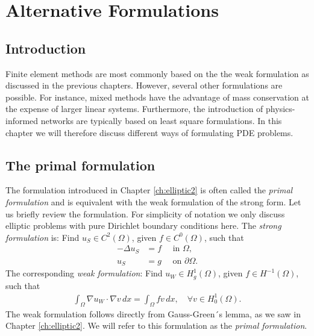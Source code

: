 \chapter{Alternative Formulations}


\section{Introduction}

Finite element methods are most commonly based on the the weak formulation as discussed in 
the previous chapters. However, several other formulations are possible.  
For instance, mixed methods have the advantage of mass conservation at the expense of larger linear systems.  
Furthermore, the introduction  of physics-informed networks are typically based on least square formulations.  
In this chapter we will therefore discuss different ways of formulating PDE problems. 

\section{The primal formulation}
The formulation introduced in Chapter \ref{ch:elliptic2} is often called the \emph{primal formulation}
and is equivalent with the weak formulation of the strong form.  
Let us briefly review the formulation. For simplicity of notation we only discuss elliptic problems 
with pure Dirichlet boundary conditions here.  
The \emph{strong formulation} is: Find $u_S \in C^2(\Omega)$, given $f \in C^0(\Omega)$, such that  
\begin{align}
\label{ch:alt:strong1}
-\Delta u_S &= f \quad \mbox{ in } \Omega, \\ 
\label{ch:alt:strong2}
 u_S &= g \quad \mbox{ on } \partial \Omega .  
\end{align}
The corresponding \emph{weak formulation}: Find $u_W \in H^1_g(\Omega)$, given  $f \in H^{-1}(\Omega)$, such 
that 
\begin{align}
\label{ch:alt:weak:primal}
\int_\Omega \nabla u_W \cdot \nabla v \, dx = \int_\Omega f v \, dx, \quad \forall v\in H^1_0(\Omega).       
\end{align}
The weak formulation  
follows directly from Gauss-Green´s lemma, as we saw in Chapter \ref{ch:elliptic2}. 
We will refer to this formulation as the \emph{primal formulation}. 

